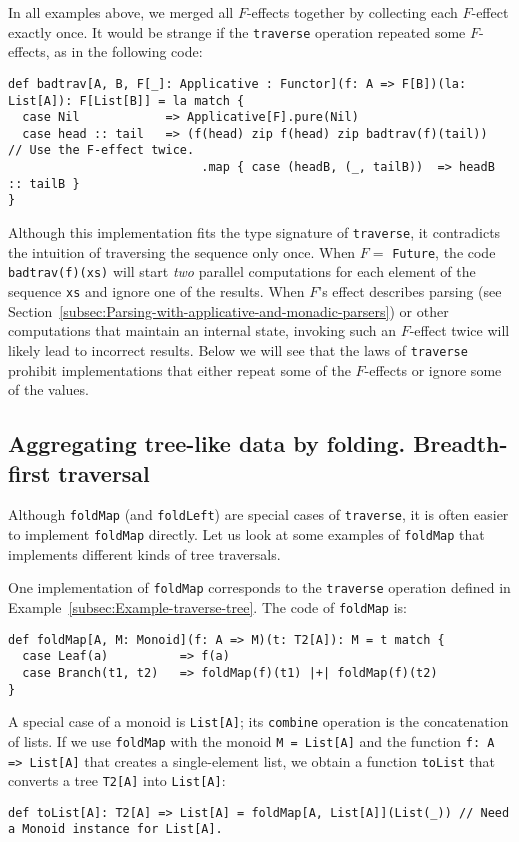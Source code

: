 In all examples above, we merged all $F$-effects together by collecting
each $F$-effect exactly once. It would be strange if the \lstinline!traverse!
operation repeated some $F$-effects, as in the following code:
\begin{lstlisting}
def badtrav[A, B, F[_]: Applicative : Functor](f: A => F[B])(la: List[A]): F[List[B]] = la match {
  case Nil            => Applicative[F].pure(Nil)
  case head :: tail   => (f(head) zip f(head) zip badtrav(f)(tail))     // Use the F-effect twice.
                           .map { case (headB, (_, tailB))  => headB :: tailB }
}
\end{lstlisting}
Although this implementation fits the type signature of \lstinline!traverse!,
it contradicts the intuition of traversing the sequence only once.
When $F=$ \lstinline!Future!, the code \lstinline!badtrav(f)(xs)!
will start \emph{two} parallel computations for each element of the
sequence \lstinline!xs! and ignore one of the results. When $F$\textsf{'}s
effect describes parsing (see Section~\ref{subsec:Parsing-with-applicative-and-monadic-parsers})
or other computations that maintain an internal state, invoking such
an $F$-effect twice will likely lead to incorrect results. Below
we will see that the laws of \lstinline!traverse! prohibit implementations
that either repeat some of the $F$-effects or ignore some of the
values.

\subsection{Aggregating tree-like data by folding. Breadth-first traversal\label{subsec:Aggregating-tree-like-data-bfs}}

Although \lstinline!foldMap! (and \lstinline!foldLeft!) are special
cases of \lstinline!traverse!, it is often easier to implement \lstinline!foldMap!
directly. Let us look at some examples of \lstinline!foldMap! that
implements different kinds of tree traversals.

One implementation of \lstinline!foldMap! corresponds to the \lstinline!traverse!
operation defined in Example~\ref{subsec:Example-traverse-tree}.
The code of \lstinline!foldMap! is:
\begin{lstlisting}
def foldMap[A, M: Monoid](f: A => M)(t: T2[A]): M = t match {
  case Leaf(a)          => f(a)
  case Branch(t1, t2)   => foldMap(f)(t1) |+| foldMap(f)(t2)
}
\end{lstlisting}

A special case of a monoid is \lstinline!List[A]!; its \lstinline!combine!
operation is the concatenation of lists. If we use \lstinline!foldMap!
with the monoid \lstinline!M = List[A]! and the function \lstinline!f: A => List[A]!
that creates a single-element list, we obtain a function \lstinline!toList!
that converts a tree \lstinline!T2[A]! into \lstinline!List[A]!:
\begin{lstlisting}
def toList[A]: T2[A] => List[A] = foldMap[A, List[A]](List(_)) // Need a Monoid instance for List[A].
\end{lstlisting}

